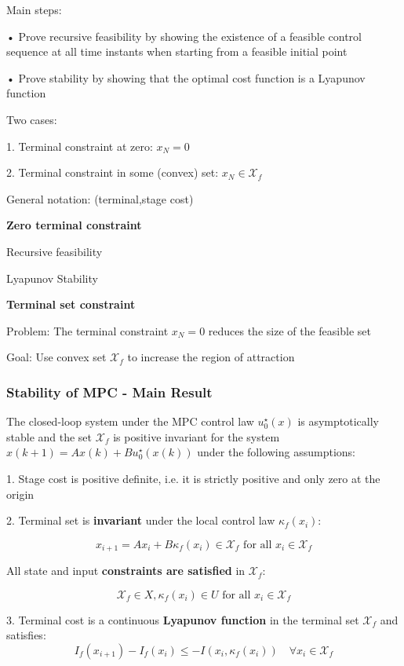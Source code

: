 Main steps:

• Prove recursive feasibility by showing the existence of a feasible control
sequence at all time instants when starting from a feasible initial point

• Prove stability by showing that the optimal cost function is a Lyapunov
function

Two cases:

1. Terminal constraint at zero: $x_N = 0$

2. Terminal constraint in some (convex) set: $x_N \in \mathcal{X}_f$

General notation:
(terminal,stage cost)

\textbf{Zero terminal constraint}

Recursive feasibility

Lyapunov Stability

\textbf{Terminal set constraint}

Problem: The terminal constraint $x_N = 0$ reduces
the size of the feasible set

Goal: Use convex set $\mathcal{X}_f$ to increase the region of attraction


\subsubsection{Stability of MPC - Main Result}

\begin{theorem}
	The closed-loop system under the MPC control law $u_0^\star(x)$
	is asymptotically stable and the set $\mathcal{X}_f$
	is positive invariant for the system
	$x(k+1) = Ax(k) + Bu_0^\star(x(k))$
	under the following assumptions:

	1. Stage cost is positive definite, i.e. it is strictly positive and only zero at
	the origin

	2. Terminal set is \textbf{invariant}
	under the local control law $\kappa_f(x_i)$:

	\[
		x_{i+1} = Ax_i + B\kappa_f(x_i) \in \mathcal{X}_f
		\text{ for all } x_i \in \mathcal{X}_f
	\]

	All state and input \textbf{constraints are satisfied} in $\mathcal{X}_f$:

	\[
		\mathcal{X}_f \in X, \kappa_f(x_i) \in U
		\text{ for all } x_i \in \mathcal{X}_f
	\]

	3. Terminal cost is a continuous \textbf{Lyapunov function}
	in the terminal set $\mathcal{X}_f$ and satisfies:
	\[
		I_f(x_{i+1}) - I_f(x_i) \leq
		- I(x_i, \kappa_f(x_i)) \quad
		\forall x_i \in \mathcal{X}_f
	\]
\end{theorem}

